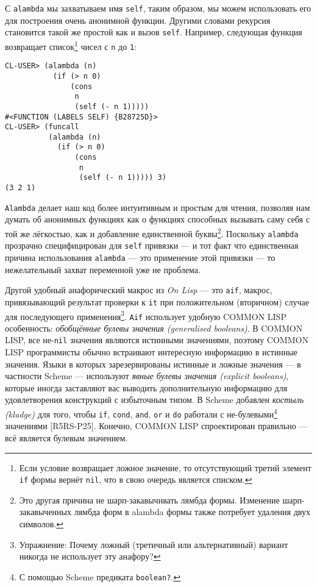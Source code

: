 С \verb"alambda" мы захватываем имя \verb"self", таким образом, мы можем использовать его для построения очень анонимной функции. Другими словами рекурсия становится такой же простой как и вызов \verb"self". Например, следующая функция возвращает список\footnote{Если условие возвращает ложное значение, то отсутствующий третий элемент \verb"if" формы вернёт \verb"nil", что в свою очередь является списком.} чисел с \verb"n" до \verb"1":


\begin{verbatim}
CL-USER> (alambda (n)
           (if (> n 0)
               (cons
                n
                (self (- n 1)))))
#<FUNCTION (LABELS SELF) {B28725D}>
CL-USER> (funcall 
          (alambda (n)
            (if (> n 0)
                (cons
                 n
                 (self (- n 1))))) 3)
(3 2 1)
\end{verbatim}


\verb"Alambda" делает наш код более интуитивным и простым для чтения, позволяя нам думать об анонимных функциях как о функциях способных вызывать саму себя с той же лёгкостью, как и добавление единственной буквы\footnote{Это другая причина не шарп-закавычивать лямбда формы. Изменение шарп-закавыченных лямбда форм в alambda формы также потребует удаления двух символов.}. Поскольку \verb"alambda" прозрачно специфицирован для \verb"self" привязки --- и тот факт что единственная причина использования \verb"alambda" --- это применение этой привязки --- то нежелательный захват переменной уже не проблема.



Другой удобный анафорический макрос из \emph{On Lisp} --- это \verb"aif", макрос, привязывающий результат проверки к \verb"it" при положительном (вторичном) случае для последующего применения\footnote{Упражнение: Почему ложный (третичный или альтернативный) вариант никогда не использует эту анафору?}. \verb"Aif" использует удобную COMMON LISP особенность: \emph{обобщённые булевы значения (generalised booleans)}. В COMMON LISP, все не-\verb"nil" значения являются истинными значениями, поэтому COMMON LISP программисты обычно встраивают интересную информацию в истинные значения. Языки в которых зарезервированы истинные и ложные значения --- в частности Scheme --- используют \emph{явные булевы значения (explicit booleans)}, которые иногда заставляют вас выводить дополнительную информацию для удовлетворения конструкций с избыточным типом. В Scheme добавлен \emph{костыль (kludge)} для того, чтобы \verb"if", \verb"cond", \verb"and", \verb"or" и \verb"do" работали с не-булевыми\footnote{С помощью Scheme предиката \verb"boolean?".} значениями [R5RS-P25]. Конечно, COMMON LISP спроектирован правильно --- всё является булевым значением.



